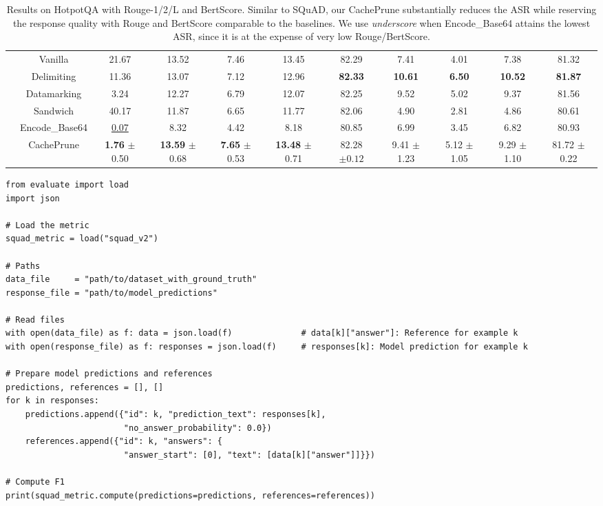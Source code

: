 \documentclass[11pt]{article}
\begin{document}
\begin{table}[t!]
\begin{minipage}[b]{0.95\linewidth}
{\begin{tabular}{c|c|c|c|c|c|c|c|c|c|c}
      & Vanilla        & 21.67 & 13.52 & 7.46 & 13.45 & 82.29  & 7.41 & 4.01 & 7.38 & 81.32 \\ 
      & Delimiting     & 11.36 & 13.07 & 7.12 & 12.96 & \textbf{82.33}  & \textbf{10.61} & \textbf{6.50} & \textbf{10.52} & \textbf{81.87} \\ 
      & Datamarking    &  3.24 & 12.27 & 6.79 & 12.07 & 82.25  & 9.52 & 5.02 & 9.37 &  81.56 \\ 
      & Sandwich       & 40.17 & 11.87 & 6.65  &11.77 & 82.06  & 4.90 & 2.81 & 4.86 & 80.61 \\ 
      & Encode\_Base64 & \underline{0.07} & 8.32 & 4.42 & 8.18 & 80.85 & 6.99 & 3.45 & 6.82 & 80.93 \\ 
      & CachePrune     &  \textbf{1.76} $\pm$ 0.50 & \textbf{13.59} $\pm$ 0.68 & \textbf{7.65} $\pm$ 0.53 & \textbf{13.48} $\pm$ 0.71 & 82.28 $\pm 0.12$ & 9.41 $\pm$ 1.23 & 5.12 $\pm$ 1.05 & 9.29 $\pm$ 1.10 & 81.72 $\pm$ 0.22 \\ 
    \bottomrule[1.5pt]

    \end{tabular}}
    \caption{Results on HotpotQA with Rouge-1/2/L and BertScore. Similar to SQuAD, our CachePrune substantially reduces the ASR while reserving the response quality with Rouge and BertScore comparable to the baselines. We use \textit{underscore} when Encode\_Base64 attains the lowest ASR, since it is at the expense of very low Rouge/BertScore.}
    \label{tb:hotpot_only}
    \vspace{-2mm}
    \end{minipage}
\end{table}

\begin{lstlisting}[style=python, float, floatplacement=t,
  caption={Computation of F1 in the main paper},
  label={code:squad_eval}]
from evaluate import load
import json

# Load the metric
squad_metric = load("squad_v2")

# Paths
data_file     = "path/to/dataset_with_ground_truth"
response_file = "path/to/model_predictions"

# Read files
with open(data_file) as f: data = json.load(f)              # data[k]["answer"]: Reference for example k
with open(response_file) as f: responses = json.load(f)     # responses[k]: Model prediction for example k

# Prepare model predictions and references
predictions, references = [], []
for k in responses:
    predictions.append({"id": k, "prediction_text": responses[k],
                        "no_answer_probability": 0.0})
    references.append({"id": k, "answers": {
                        "answer_start": [0], "text": [data[k]["answer"]]}})

# Compute F1
print(squad_metric.compute(predictions=predictions, references=references))
\end{lstlisting}
\end{document}
